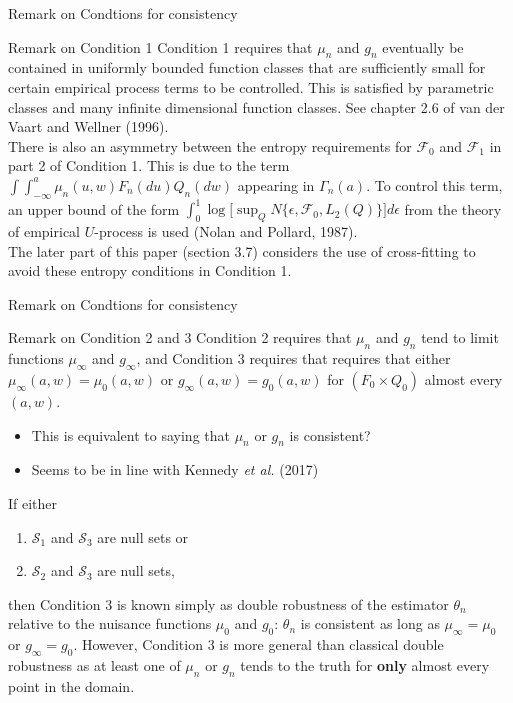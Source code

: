\documentclass{beamer}
\newcommand{\vs}[1]{\vspace{#1 cm}}
\begin{document}
\begin{frame}{Remark on Condtions for consistency} \label{slide:remarkCon1}
  \begin{block}{Remark on Condition 1}
    Condition 1 requires that $\mu_n$ and $g_n$ eventually be contained in uniformly bounded function classes that are sufficiently small for certain empirical process terms to be controlled.
    This is satisfied by parametric classes and many infinite dimensional function classes. See chapter 2.6 of van der Vaart and Wellner (1996). \\
    \vs{0.3}
    There is also an asymmetry between the entropy requirements for $\mathcal{F}_0$ and $\mathcal{F}_1$ in part 2 of Condition 1. This is due to the term $\int \int_{-\infty}^a \mu_n(u,w) F_n(du) Q_n(dw)$ appearing in $\Gamma_n(a)$.
    To control this term, an upper bound of the form $\int_0^1 \log\big[ \sup_Q N\{ \epsilon, \mathcal{F}_0, L_2(Q) \} \big] d\epsilon$ from the theory of empirical $U$-process is used (Nolan and Pollard, 1987). \\
    \vs{0.3}
    The later part of this paper (section 3.7) considers the use of cross-fitting to avoid these entropy conditions in Condition 1.
  \end{block}
\end{frame}

\begin{frame}{Remark on Condtions for consistency} \label{slide:remarkCon3}
  \begin{block}{Remark on Condition 2 and 3}
    Condition 2 requires that $\mu_n$ and $g_n$ tend to limit functions $\mu_\infty$ and $g_\infty$, and Condition 3 requires that requires that either $\mu_\infty(a,w) = \mu_0(a,w)$ or $g_\infty(a,w) = g_0(a,w)$ for $(F_0 \times Q_0)$ almost every $(a,w)$.
    \begin{itemize}
      \item This is equivalent to saying that $\mu_n$ or $g_n$ is consistent?
      \item Seems to be in line with Kennedy \textit{et al.} (2017)
    \end{itemize}
    If either
    \begin{enumerate}
      \item $\mathcal{S}_1$ and $\mathcal{S}_3$ are null sets or
      \item $\mathcal{S}_2$ and $\mathcal{S}_3$ are null sets,
    \end{enumerate}
    then Condition 3 is known simply as double robustness of the estimator $\theta_n$ relative to the nuisance functions $\mu_0$ and $g_0$: $\theta_n$ is consistent as long as $\mu_\infty = \mu_0$ or $g_\infty = g_0$.
    However, Condition 3 is more general than classical double robustness as at least one of $\mu_n$ or $g_n$ tends to the truth for \textbf{only} almost every point in the domain.
  \end{block}
\end{frame}
\end{document}
